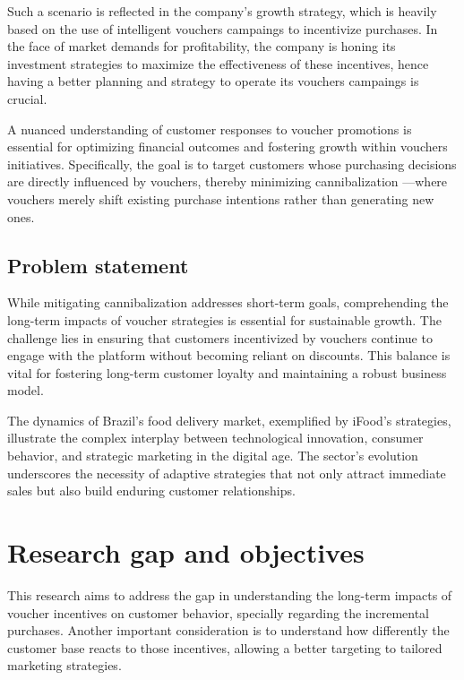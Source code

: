 Such a scenario is reflected in the company's growth strategy, which is heavily based on the use of intelligent vouchers campaings
to incentivize purchases. In the face of market demands for profitability, the company is honing its investment strategies to maximize 
the effectiveness of these incentives, hence having a better planning and strategy to operate its vouchers campaings is crucial.

A nuanced understanding of customer responses to voucher promotions is essential for optimizing financial outcomes and 
fostering growth within vouchers initiatives. Specifically, the goal is to target customers whose purchasing decisions are directly 
influenced by vouchers, thereby minimizing cannibalization —where vouchers merely shift existing purchase intentions rather
than generating new ones.

\subsection{Problem statement}
\label{sub:the_problem}

While mitigating cannibalization addresses short-term goals, comprehending the long-term impacts of voucher strategies is 
essential for sustainable growth. The challenge lies in ensuring that customers incentivized by vouchers continue to engage
with the platform without becoming reliant on discounts. This balance is vital for fostering long-term customer loyalty and
maintaining a robust business model.

The dynamics of Brazil's food delivery market, exemplified by iFood's strategies, illustrate the complex interplay 
between technological innovation, consumer behavior, and strategic marketing in the digital age. The sector's evolution 
underscores the necessity of adaptive strategies that not only attract immediate sales but also build enduring customer
relationships.

\section{Research gap and objectives}
\label{sub:research_gap_and_objectives}

This research aims to address the gap in understanding the long-term impacts of voucher incentives on customer behavior, 
specially regarding the incremental purchases. Another important consideration is to understand how differently the customer
base reacts to those incentives, allowing a better targeting to tailored marketing strategies.


